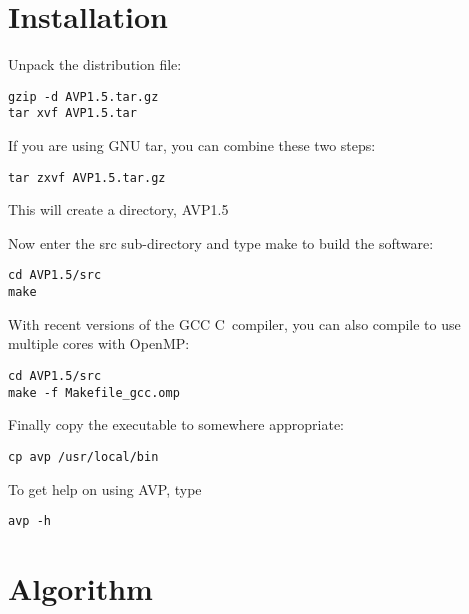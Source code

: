 \documentclass{article}
\begin{document}
\section{Installation}
Unpack the distribution file:

\begin{verbatim}
gzip -d AVP1.5.tar.gz
tar xvf AVP1.5.tar
\end{verbatim}

If you are using GNU tar, you can combine these two steps:

\begin{verbatim}
tar zxvf AVP1.5.tar.gz
\end{verbatim}

This will create a directory, AVP1.5

Now enter the src sub-directory and type make to build the software:

\begin{verbatim}
cd AVP1.5/src
make
\end{verbatim}

With recent versions of the GCC C~compiler, you can also compile to
use multiple cores with OpenMP:

\begin{verbatim}
cd AVP1.5/src
make -f Makefile_gcc.omp
\end{verbatim}


Finally copy the executable to somewhere appropriate:

\begin{verbatim}
cp avp /usr/local/bin
\end{verbatim}

To get help on using AVP, type

\begin{verbatim}
avp -h
\end{verbatim}



\section{Algorithm}
\end{document}
